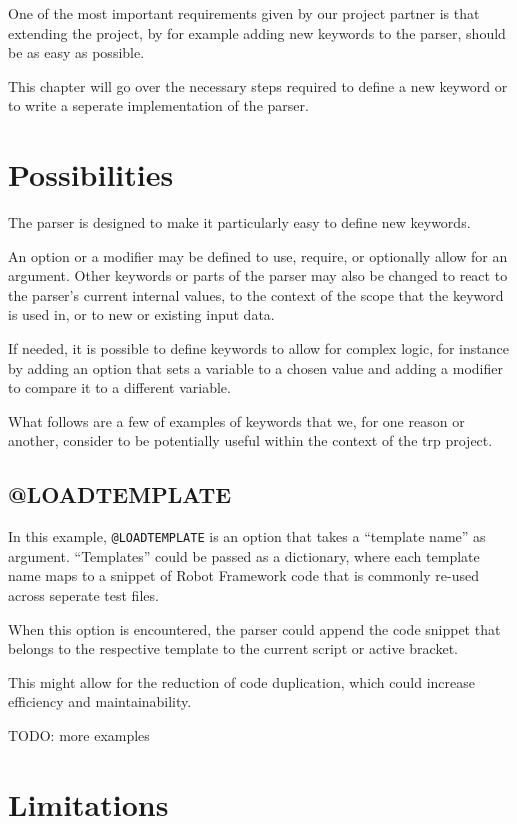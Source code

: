 One of the most important requirements given by our project partner is that extending the project, by for example adding new keywords to the parser, should be as easy as possible. 

This chapter will go over the necessary steps required to define a new keyword or to write a seperate implementation of the parser. 

\section{Possibilities}

The parser is designed to make it particularly easy to define new keywords.

An option or a modifier may be defined to use, require, or optionally allow for an argument. Other keywords or parts of the parser may also be changed to react to the parser's current internal values, to the context of the scope that the keyword is used in, or to new or existing input data. 

If needed, it is possible to define keywords to allow for complex logic, for instance by adding an option that sets a variable to a chosen value and adding a modifier to compare it to a different variable.

What follows are a few of examples of keywords that we, for one reason or another, consider to be potentially useful within the context of the \gls{trp} project. 

\subsection{@LOADTEMPLATE}

In this example, \verb|@LOADTEMPLATE| is an option that takes a ``template name'' as argument. ``Templates'' could be passed as a dictionary, where each template name maps to a snippet of Robot Framework code that is commonly re-used across seperate test files. 

When this option is encountered, the parser could append the code snippet that belongs to the respective template to the current script or active bracket. 

This might allow for the reduction of code duplication, which could increase efficiency and maintainability. 

TODO: more examples

\section{Limitations}

